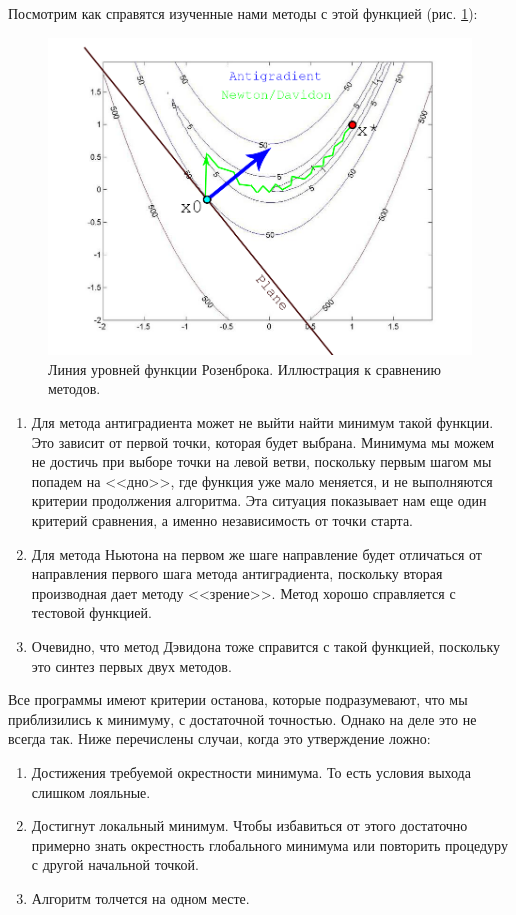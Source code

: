 Посмотрим как справятся изученные нами методы с этой функцией (рис. \ref{fig:Rosenbrock_levels}):
\begin{figure}
    \centering
    \includegraphics[scale = 0.5]{Pictures/Rosenbrock_levels.png}
    \caption{Линия уровней функции Розенброка. Иллюстрация к сравнению методов.}
    \label{fig:Rosenbrock_levels}
\end{figure}
\begin{enumerate}
    \item Для метода антиградиента может не выйти найти минимум такой функции. Это зависит от первой точки, которая будет выбрана. Минимума мы можем не достичь при выборе точки на левой ветви, поскольку первым шагом мы попадем на <<дно>>, где функция уже мало меняется, и не выполняются критерии продолжения алгоритма. Эта ситуация показывает нам еще один критерий сравнения, а именно независимость от точки старта.
    \item Для метода Ньютона на первом же шаге направление будет отличаться от направления первого шага метода антиградиента, поскольку вторая производная дает методу <<зрение>>. Метод хорошо справляется с тестовой функцией.
    \item Очевидно, что метод Дэвидона тоже справится с такой функцией, поскольку это синтез первых двух методов.
\end{enumerate}
Все программы имеют критерии останова, которые подразумевают, что мы приблизились к минимуму, с достаточной точностью. Однако на деле это не всегда так. Ниже перечислены случаи, когда это утверждение ложно:
\begin{enumerate}
    \item Достижения требуемой окрестности минимума. То есть условия выхода слишком лояльные.
    \item Достигнут локальный минимум. Чтобы избавиться от этого достаточно примерно знать окрестность глобального минимума или повторить процедуру с другой начальной точкой.
    \item Алгоритм толчется на одном месте.
\end{enumerate}

